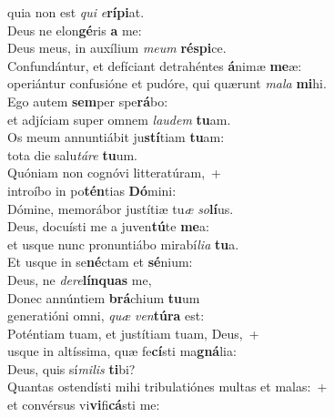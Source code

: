 \evenverse quia non est \textit{qui} \textit{e}\textbf{rí}\textbf{pi}at.\\
\oddverse Deus ne elon\textbf{gé}ris \textbf{a} me:~\*\\
\oddverse Deus meus, in auxílium \textit{me}\textit{um} \textbf{ré}\textbf{spi}ce.\\
\evenverse Confundántur, et defíciant detrahéntes \textbf{á}nimæ \textbf{me}æ:~\*\\
\evenverse operiántur confusióne et pudóre, qui quærunt \textit{ma}\textit{la} \textbf{mi}hi.\\
\oddverse Ego autem \textbf{sem}per spe\textbf{rá}bo:~\*\\
\oddverse et adjíciam super omnem \textit{lau}\textit{dem} \textbf{tu}am.\\
\evenverse Os meum annuntiábit ju\textbf{stí}tiam \textbf{tu}am:~\*\\
\evenverse tota die salu\textit{tá}\textit{re} \textbf{tu}um.\\
\oddverse Quóniam non cognóvi litteratúram,~+\\
\oddverse  introíbo in po\textbf{tén}tias \textbf{Dó}mini:~\*\\
\oddverse Dómine, memorábor justítiæ tu\textit{æ} \textit{so}\textbf{lí}us.\\
\evenverse Deus, docuísti me a juven\textbf{tú}te \textbf{me}a:~\*\\
\evenverse et usque nunc pronuntiábo mirabí\textit{li}\textit{a} \textbf{tu}a.\\
\oddverse Et usque in se\textbf{né}ctam et \textbf{sé}nium:~\*\\
\oddverse Deus, ne \textit{de}\textit{re}\textbf{lín}\textbf{quas} me,\\
\evenverse Donec annúntiem \textbf{brá}chium \textbf{tu}um~\*\\
\evenverse generatióni omni, \textit{quæ} \textit{ven}\textbf{tú}\textbf{ra} est:\\
\oddverse Poténtiam tuam, et justítiam tuam, Deus,~+\\
\oddverse  usque in altíssima, quæ fe\textbf{cí}sti ma\textbf{gná}lia:~\*\\
\oddverse Deus, quis sí\textit{mi}\textit{lis} \textbf{ti}bi?\\
\evenverse Quantas ostendísti mihi tribulatiónes multas et malas:~+\\
\evenverse  et convérsus vi\textbf{vi}fi\textbf{cá}sti me:~\*\\
